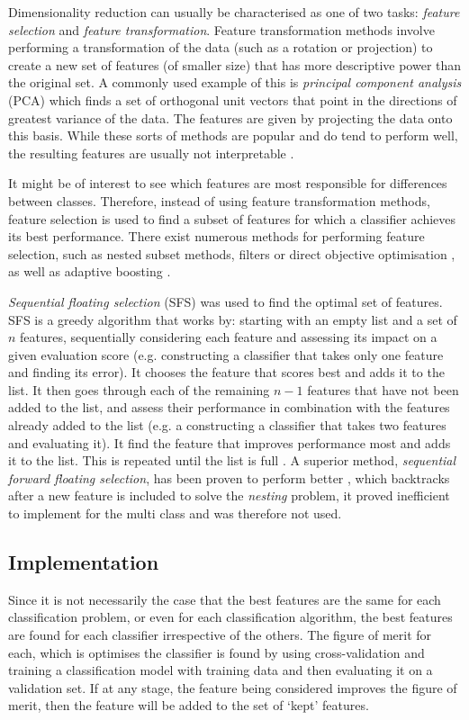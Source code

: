 Dimensionality reduction can usually be characterised as one of two tasks: \textit{feature selection} and \textit{feature transformation}. Feature transformation methods involve performing a transformation of the data (such as a rotation or projection) to create a new set of features (of smaller size) that has more descriptive power than the original set. A commonly used example of this is \textit{principal component analysis} (PCA) which finds a set of orthogonal unit vectors that point in the directions of greatest variance of the data. The features are given by projecting the data onto this basis. While these sorts of methods are popular and do tend to perform well, the resulting features are usually not interpretable \cite{Guyon}. 

It might be of interest to see which features are most responsible for differences between classes. Therefore, instead of using feature transformation methods, feature selection is used to find a subset of features for which a classifier achieves its best performance. There exist numerous methods for performing feature selection, such as nested subset methods, filters or direct objective optimisation \cite{Guyon}, as well as adaptive boosting \cite{Wang_2}.

\textit{Sequential floating selection} (SFS) \cite{Somol} was used to find the optimal set of features. SFS is a greedy algorithm that works by: starting with an empty list and a set of $n$ features, sequentially considering each feature and assessing its impact on a given evaluation score (e.g. constructing a classifier that takes only one feature and finding its error). It chooses the feature that scores best and adds it to the list. It then goes through each of the remaining $n-1$ features that have not been added to the list, and assess their performance in combination with the features already added to the list (e.g. a constructing a classifier that takes two features and evaluating it). It find the feature that improves performance most and adds it to the list. This is repeated until the list is full \cite{Juha}. A superior method, \textit{sequential forward floating selection}, has been proven to perform better \cite{Somol}, which backtracks after a new feature is included to solve the \textit{nesting} problem, it proved inefficient to implement for the multi class and was therefore not used.

\subsection{Implementation}
Since it is not necessarily the case that the best features are the same for each classification problem, or even for each classification algorithm, the best features are found for each classifier irrespective of the others. The figure of merit for each, which is optimises the classifier is found by using cross-validation and training a classification model with training data and then evaluating it on a validation set. If at any stage, the feature being considered improves the figure of merit, then the feature will be added to the set of `kept' features.

